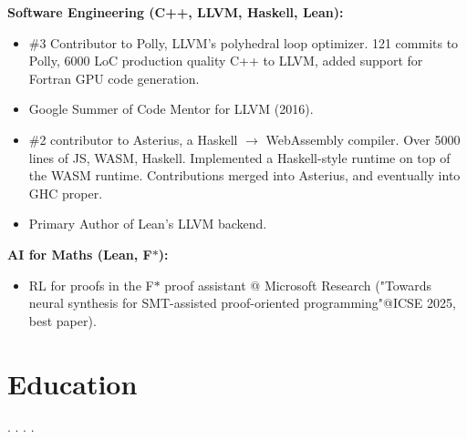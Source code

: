 \documentclass[10pt,a4paper,sans,colorlinks]{moderncv}        %
\begin{document}
\textbf{Software Engineering (C++, LLVM, Haskell, Lean):}
\begin{itemize}
\item \#3 Contributor to Polly, LLVM's polyhedral loop optimizer. 121 commits to Polly, 6000 LoC production quality C++ to LLVM,
  added support for Fortran GPU code generation.
\item Google Summer of Code Mentor for LLVM (2016).
\item \#2 contributor to Asterius, a Haskell $\to$ WebAssembly compiler. Over 5000 lines of JS, WASM, Haskell.
   Implemented a Haskell-style runtime on top of the WASM runtime. Contributions merged into Asterius, and eventually into GHC proper.
\item Primary Author of Lean's LLVM backend.
\end{itemize}


\textbf{AI for Maths (Lean, F$\ast$):}
\begin{itemize}
\item RL for proofs in the F$\ast$ proof assistant @ Microsoft Research ("Towards neural synthesis for SMT-assisted proof-oriented programming"@ICSE 2025, best paper).
\end{itemize}

\section{Education}
.
.
.
.
\end{document}
